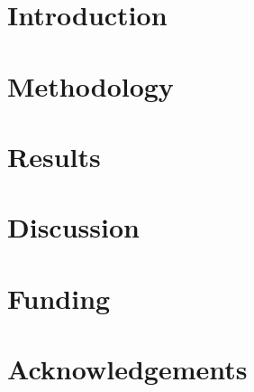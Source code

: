 \documentclass{article}
\begin{document}

\section{Introduction}\label{intro}


\section{Methodology}\label{method}


\section{Results}\label{results}


\section{Discussion}\label{discuss}


\section*{Funding}


\section*{Acknowledgements}




\end{document}

